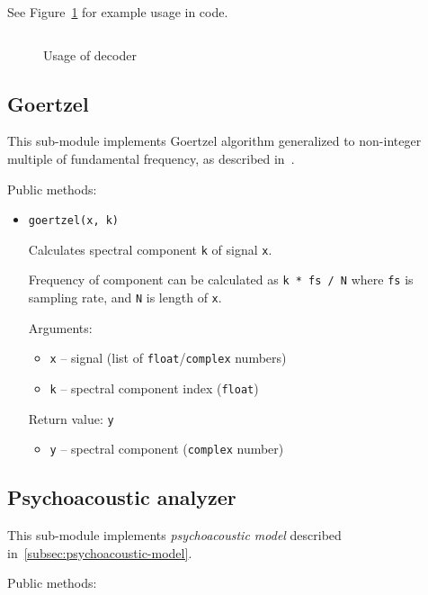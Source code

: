 \documentclass[english,bachelor,a4paper,oneside]{ppfcmthesis}
\begin{document}
See Figure~\ref{fig:decoder-example} for example usage in code.

\begin{figure}[p]
\centering
\inputminted[linenos]{python}{listings/decoder_example.py}
\caption{Usage of decoder}
\label{fig:decoder-example}
\end{figure}

\subsection{Goertzel}

This sub-module implements Goertzel algorithm generalized to non-integer multiple of fundamental frequency, as described in~\cite{PS12}.

Public methods:
\begin{itemize}
\item \verb|goertzel(x, k)|

  Calculates spectral component \verb|k| of signal \verb|x|.

  Frequency of component can be calculated as \verb|k * fs / N| where \verb|fs| is sampling rate, and \verb|N| is length of \verb|x|.

  Arguments:
  \begin{itemize}
  \item \verb|x| -- signal (list of \verb|float|/\verb|complex| numbers)
  \item \verb|k| -- spectral component index (\verb|float|)
  \end{itemize}

  Return value: \verb|y|
  \begin{itemize}
  \item \verb|y| -- spectral component (\verb|complex| number)
  \end{itemize}
\end{itemize}

\subsection{Psychoacoustic analyzer}

This sub-module implements \emph{psychoacoustic model} described in~\ref{subsec:psychoacoustic-model}.

Public methods:
\end{document}
